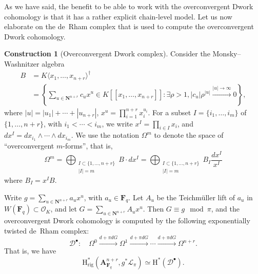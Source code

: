 \documentclass{amsart}
\numberwithin{equation}{section}
\theoremstyle{plain}
\theoremstyle{definition}
\newtheorem{construction}[equation]{Construction}
\renewcommand{\mathbb}{\mathbf}
\begin{document}
As we have said, the benefit to be able to work with the overconvergent
Dwork cohomology is that it has a rather explicit chain-level model.
Let us now elaborate on the de~Rham complex that is used to compute
the overconvergent Dwork cohomology.

\begin{construction}[Overconvergent Dwork complex]
\label{construction:exponential-model-complex}
Consider the Monsky--Washnitzer algebra
\begin{align*}
  B &= K\langle x_{1},\ldots,x_{n+r} \rangle^{\dagger}\\
  &=
    \left\{
    \sum_{u\in \mathbb{N}^{n+r}} c_{u} x^{u}  \in K[\![x_{1},\ldots,x_{n+r}]\!] : \exists \rho > 1,
    |c_{u}|\rho^{|u|} \xrightarrow{|u| \to \infty} 0
    \right\},
\end{align*}
where \(|u| = |u_{1}| + \cdots + |u_{n+r}|\), \(x^{u} = \prod_{i=1}^{n+r} x_{i}^{u_{i}}\).
For a subset \(I=\{i_{1},\ldots,i_{m}\}\) of \(\{1,\ldots,n+r\}\), with \(i_{1}<\cdots<i_{m}\),
we write \(x^{I} = \prod_{i\in I}x_{i}\),
and \(dx^{I} = dx_{i_{1}}\wedge\cdots\wedge dx_{i_{m}}\).
We use the notation \(\Omega^{m}\) to denote the space of ``overconvergent \(m\)-forms'',
that is,
\begin{equation}
\label{eq:decompose-differential-forms}
\Omega^{m} = \bigoplus_{\substack{I\subset\{1,\ldots,n+r\}\\|I|=m}} B\cdot dx^{I}
= \bigoplus_{\substack{I\subset\{1,\ldots,n+r\}\\|I|=m}} B_{I} \frac{dx^{I}}{x^{I}}
\end{equation}
where \(B_{I} = x^{I}B\).

Write \(g = \sum_{u\in \mathbb{N}^{n+r}} a_{u}x^{u}\), with
\(a_{u}\in \mathbb{F}_{q}\).  Let \(A_{u}\) be the Teichmüller lift of
\(a_{u}\) in \(W(\mathbb{F}_{q}) \subset \mathcal{O}_{K}\), and let
\(G = \sum_{u\in \mathbb{N}^{n+r}}A_{u}x^{u}\).  Then
\(G \equiv g \mod \pi\), and the overconvergent Dwork cohomology is
computed by the following exponentially twisted de~Rham complex:
\begin{equation}
\label{eq:dwork-complex}
\mathcal{D}^{\bullet}: \quad\Omega^{0} \xrightarrow{d + \pi dG} \Omega^{1} \xrightarrow{d + \pi dG} \cdots \xrightarrow{d + \pi dG} \Omega^{n+r}.
\end{equation}
That is, we have
\begin{equation*}
\mathrm{H}^{\ast}_{\mathrm{rig}}(\mathbb{A}^{n+r}_{\mathbb{F}_{q}},g^{\ast}\mathcal{L}_{\pi}) \simeq
\mathrm{H}^{\ast}(\mathcal{D}^{\bullet}).
\end{equation*}
\end{construction}
\end{document}
